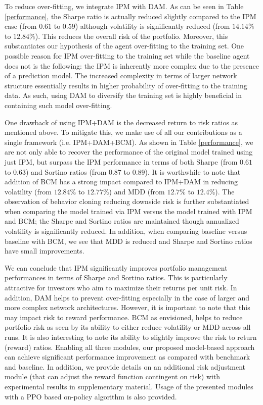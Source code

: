 \documentclass{article}
\begin{document}
To reduce over-fitting, we integrate IPM with DAM. As can be seen in Table \ref{performance}, the Sharpe ratio is actually reduced slightly compared to the IPM case (from $0.61$ to $0.59$) although volatility is significantly reduced (from $14.14\%$ to $12.84\%$). This reduces the overall risk of the portfolio. Moreover, this substantiates our hypothesis of the agent over-fitting to the training set. One possible reason for IPM over-fitting to the training set while the baseline agent does not is the following: the IPM is inherently more complex due to the presence of a prediction model. The increased complexity in terms of larger network structure essentially results in higher probability of over-fitting to the training data. As such, using DAM to diversify the training set is highly beneficial in containing such model over-fitting.

One drawback of using IPM+DAM is the decreased return to risk ratios as mentioned above. To mitigate this, we make use of all our contributions as a single framework (i.e. IPM+DAM+BCM). As shown in Table \ref{performance}, we are not only able to recover the performance of the original model trained using just IPM, but surpass the IPM performance in terms of both Sharpe (from $0.61$ to $0.63$) and Sortino ratios (from $0.87$ to $0.89$). It is worthwhile to note that addition of BCM has a strong impact compared to IPM+DAM in reducing volatility (from $12.84\%$ to $12.77\%$) and MDD (from $12.7\%$ to $12.4\%$). %
The observation of behavior cloning reducing downside risk is further substantiated when comparing the model trained via IPM versus the model trained with IPM and BCM; the Sharpe and Sortino ratios are maintained though annualized volatility is significantly reduced. In addition, when comparing baseline versus baseline with BCM, we see that MDD is reduced and Sharpe and Sortino ratios have small improvements.

We can conclude that IPM significantly improves portfolio management performances in terms of Sharpe and Sortino ratios. This is particularly attractive for investors who aim to maximize their returns per unit risk. In addition, DAM helps to prevent over-fitting especially in the case of larger and more complex network architectures. However, it is important to note that this may impact risk to reward performance. BCM as envisioned, helps to reduce portfolio risk as seen by its ability to either reduce volatility or MDD across all runs. It is also interesting to note its ability to slightly improve the risk to return (reward) ratios. %
Enabling all three modules, our proposed model-based approach can achieve significant performance improvement as compared with benchmark and baseline. In addition, we provide details on an additional risk adjustment module (that can adjust the reward function contingent on risk) with experimental results in supplementary material. Usage of the presented modules with a PPO based on-policy algorithm is also provided.
\end{document}
